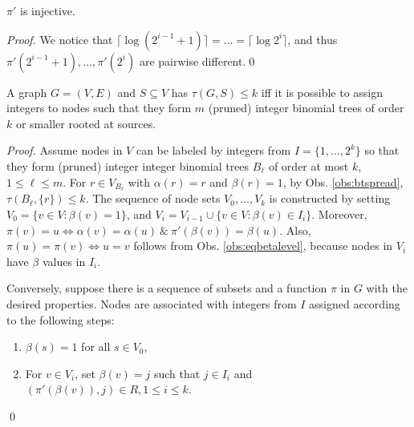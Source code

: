 \begin{observation}\label{obs:eqbetalevel}
$\pi'$ is injective.
\end{observation}
\begin{proof}
We notice that $\lceil\log (2^{i-1}+1)\rceil=\dots =\lceil\log 2^i\rceil$, and thus $\pi'(2^{i-1}+1),\dots,\pi'(2^i)$ are pairwise different.\qed 
\end{proof}

\begin{proposition}\label{lem:probeq}
A graph $G=(V,E)$ and $S\subseteq V$ has $\tau(G,S)\leq k$ iff it is possible to assign integers to nodes
such that they form $m$ (pruned) integer binomial trees of order $k$ or smaller rooted at sources.
\end{proposition}
\begin{proof}
Assume nodes in $V$ can be labeled by integers from $I=\{1,\dots,2^k\}$ so that they form (pruned) integer integer binomial trees $B_\ell$ of order at most $k$, $1\leq\ell\leq m$.
For $r\in V_{B_\ell}$ with $\alpha(r)=r$ and $\beta(r)=1$, by Obs. \ref{obs:btspread}, $\tau(B_\ell,\{r\})\leq k$.
The sequence of node sets $V_0,\dots,V_k$ is constructed by setting $V_0=\{v\in V:\beta(v)=1\}$, and $V_{i}=V_{i-1}\cup\{v\in V: \beta(v)\in I_i\}$.
Moreover, $\pi(v)=u\Leftrightarrow \alpha(v)=\alpha(u)~\&~\pi'(\beta(v))=\beta(u)$.
Also, $\pi(u)=\pi(v)\Leftrightarrow u=v$ follows from Obs. \ref{obs:eqbetalevel}, because nodes in $V_i$ have $\beta$ values in $I_i$.

Conversely, suppose there is a sequence of subsets and a function $\pi$ in $G$ with the desired properties.
Nodes are associated with integers from $I$ assigned according to the following steps:
\begin{enumerate}
\item $\beta(s)=1$ for all $s\in V_0$,
\item For $v\in V_i$, set $\beta(v)=j$ such that $j\in I_i$ and $(\pi'(\beta(v)),j)\in R, 1\leq i\leq k$.  
\end{enumerate}
\qed
\end{proof}
